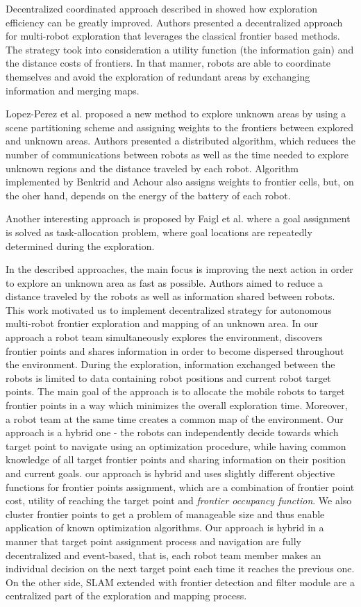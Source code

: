 Decentralized coordinated approach described in \cite{Colares2016} showed how exploration efficiency can be greatly improved. Authors presented a decentralized approach for multi-robot exploration that leverages the classical frontier based methods. The strategy took into consideration a utility function (the information gain) and the distance costs of frontiers. In that manner, robots are able to coordinate themselves and avoid the exploration of redundant areas by exchanging information and merging maps.

Lopez-Perez et al. \cite{LopezPerez2018} proposed a new method to explore unknown areas by using a scene partitioning scheme and assigning weights to the frontiers between explored and unknown areas. Authors presented a distributed algorithm, which reduces the number of communications between robots as well as the time needed to explore unknown regions and the distance traveled by each robot. Algorithm implemented by Benkrid and Achour \cite{Benkrid2017} also assigns weights to frontier cells, but, on the oher hand, depends on the energy of the battery of each robot.

Another interesting approach is proposed by Faigl et al. \cite{Faigl2015} where a goal assignment is solved as task-allocation problem, where goal locations are repeatedly determined during the exploration. 

In the described approaches, the main focus is improving the next action in order to explore an unknown area as fast as possible. Authors aimed to reduce a distance traveled by the robots as well as information shared between robots. This work motivated us to implement decentralized strategy for autonomous multi-robot frontier exploration and mapping of an unknown area. In our approach a robot team simultaneously explores the environment, discovers frontier points and shares information in order to become dispersed throughout the environment. During the exploration, information exchanged between the robots is limited to data containing robot positions and current robot target points. The main goal of the approach is to allocate the mobile robots to target frontier points in a way which minimizes the overall exploration time. Moreover, a robot team at the same time creates a common map of the environment. Our approach is a hybrid one - the robots can independently decide towards which target point to navigate using an optimization procedure, while having common knowledge of all target frontier points and sharing information on their position and current goals.  our approach is hybrid and uses slightly different objective functions for frontier points assignment, which are a combination of frontier point cost, utility of reaching the target point and \textit{frontier occupancy function}. We also cluster frontier points to get a problem of manageable size and thus enable application of known optimization algorithms. 
Our approach is hybrid in a manner that target point assignment process and navigation are fully decentralized and event-based, that is, each robot team member makes an individual decision on the next target point each time it reaches the previous one. On the other side, SLAM extended with frontier detection and filter module are a centralized part of the exploration and mapping process.


